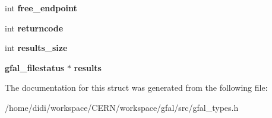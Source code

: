 \begin{DoxyCompactItemize}
\item 
int {\bfseries free\_\-endpoint}\label{structgfal__internal___ad00f521a96c2f4f7433c0c2660d8e889}

\item 
int {\bfseries returncode}\label{structgfal__internal___a6acce194273de8fc35fdf67a2d558d32}

\item 
int {\bfseries results\_\-size}\label{structgfal__internal___abf17840bb1e55ac4b1390afb8987d269}

\item 
{\bf gfal\_\-filestatus} $\ast$ {\bfseries results}\label{structgfal__internal___a4082508c66520d4f405d76af99b0834b}

\end{DoxyCompactItemize}


The documentation for this struct was generated from the following file:\begin{DoxyCompactItemize}
\item 
/home/didi/workspace/CERN/workspace/gfal/src/gfal\_\-types.h\end{DoxyCompactItemize}
